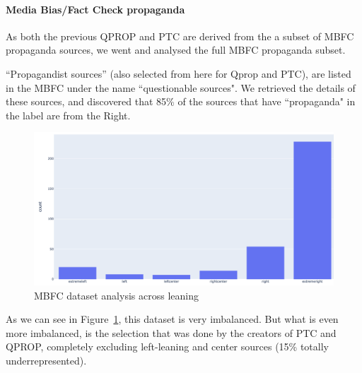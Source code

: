 \paragraph{Media Bias/Fact Check propaganda}
As both the previous QPROP and PTC are derived from the a subset of MBFC propaganda sources, we went and analysed the full MBFC propaganda subset.

“Propagandist sources” (also selected from here for Qprop and PTC), are listed in the MBFC under the name ``questionable sources".
We retrieved the details of these sources, and discovered that 85\% of the sources that have ``propaganda" in the label are from the Right.

\begin{figure}[!htb]
   \centering
   \includegraphics[width=\linewidth]{figures/leaning_questionable.png}
   \caption{MBFC dataset analysis across leaning}
   \label{fig:mbfc_across_leaning}
\end{figure}

As we can see in Figure~\ref{fig:mbfc_across_leaning}, this dataset is very imbalanced. But what is even more imbalanced, is the selection that was done by the creators of PTC and QPROP, completely excluding left-leaning and center sources (15\% totally underrepresented).




